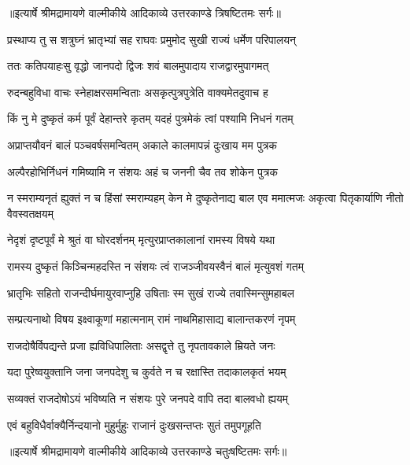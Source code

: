 {॥इत्यार्षे श्रीमद्रामायणे वाल्मीकीये आदिकाव्ये उत्तरकाण्डे त्रिषष्टितमः सर्गः॥}


\twolineshloka
{प्रस्थाप्य तु स शत्रुघ्नं भ्रातृभ्यां सह राघवः}
{प्रमुमोद सुखी राज्यं धर्मेण परिपालयन्} %

\twolineshloka
{ततः कतिपयाहःसु वृद्धो जानपदो द्विजः}
{शवं बालमुपादाय राजद्वारमुपागमत्} %

\twolineshloka
{रुदन्बहुविधा वाचः स्नेहाक्षरसमन्विताः}
{असकृत्पुत्रपुत्रेति वाक्यमेतदुवाच ह} %

\twolineshloka
{किं नु मे दुष्कृतं कर्म पूर्वं देहान्तरे कृतम्}
{यदहं पुत्रमेकं त्वां पश्यामि निधनं गतम्} %

\twolineshloka
{अप्राप्तयौवनं बालं पञ्चवर्षसमन्वितम्}
{अकाले कालमापन्नं दुःखाय मम पुत्रक} %

\twolineshloka
{अल्पैरहोभिर्निधनं गमिष्यामि न संशयः}
{अहं च जननी चैव तव शोकेन पुत्रक} %

\threelineshloka
{न स्मराम्यनृतं ह्युक्तं न च हिंसां स्मराम्यहम्}
{केन मे दुष्कृतेनाद्य बाल एव ममात्मजः}
{अकृत्वा पितृकार्याणि नीतो वैवस्वतक्षयम्} %

\twolineshloka
{नेदृशं दृष्टपूर्वं मे श्रुतं वा घोरदर्शनम्}
{मृत्युरप्राप्तकालानां रामस्य विषये यथा} %

\twolineshloka
{रामस्य दुष्कृतं किञ्चिन्महदस्ति न संशयः}
{त्वं राजञ्जीवयस्वैनं बालं मृत्युवशं गतम्} %

\twolineshloka
{भ्रातृभिः सहितो राजन्दीर्घमायुरवाप्नुहि}
{उषिताः स्म सुखं राज्ये तवास्मिन्सुमहाबल} %

\twolineshloka
{सम्प्रत्यनाथो विषय इक्ष्वाकूणां महात्मनाम्}
{रामं नाथमिहासाद्य बालान्तकरणं नृपम्} %

\twolineshloka
{राजदोषैर्विपद्यन्ते प्रजा ह्यविधिपालिताः}
{असद्वृत्ते तु नृपतावकाले म्रियते जनः} %

\twolineshloka
{यदा पुरेष्वयुक्तानि जना जनपदेशु च}
{कुर्वते न च रक्षास्ति तदाकालकृतं भयम्} %

\twolineshloka
{सव्यक्तं राजदोषोऽयं भविष्यति न संशयः}
{पुरे जनपदे वापि तदा बालवधो ह्ययम्} %

\twolineshloka
{एवं बहुविधैर्वाक्यैर्निन्दयानो मुहुर्मुहुः}
{राजानं दुःखसन्तप्तः सुतं तमुपगूहति} %


{॥इत्यार्षे श्रीमद्रामायणे वाल्मीकीये आदिकाव्ये उत्तरकाण्डे चतुःषष्टितमः सर्गः॥}


